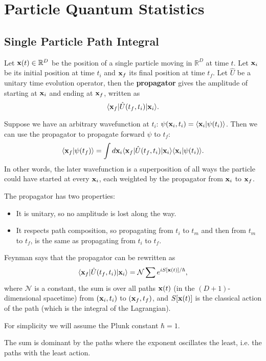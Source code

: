 \section{Particle Quantum Statistics}

\subsection{Single Particle Path Integral}


Let $\vb x (t) \in \mathbb{R}^D$ be the position of a single particle moving in $\mathbb{R}^D$ at time $t$. Let $\vb x_i$ be its initial position at time $t_i$ and $\vb x_f$ its final position at time $t_f$. Let $\hat{U}$ be a unitary time evolution operator, then the \textbf{propagator} gives the amplitude of starting at $\vb x_i$ and ending at $\vb x_f$, written as $$
\langle \vb x_f | \hat{U} (t_f, t_i) | \vb x_i \rangle
.$$        

Suppose we have an arbitrary wavefunction at $t_i$: $\psi (\vb x_i , t_i) = \langle \vb x_i | \psi (t_i)  \rangle$. Then we can use the propagator to propagate forward $\psi$ to $t_f$: $$
\langle \vb x_f | \psi (t_f) \rangle = \int d \vb x_i \langle \vb x_f | \hat{U} (t_f, t_i) | \vb x_i \rangle \langle \vb x_i | \psi (t_i)  \rangle
.$$  
In other words, the later wavefunction is a superposition of all ways the particle could have started at every $\vb x_i$, each weighted by the propagator from $\vb x_i$ to $\vb x_f$. 


The propagator has two properties:
\begin{itemize}
    \item It is unitary, so no amplitude is lost along the way.
    \item It respects path composition, so propagating from $t_i$ to $t_m$ and then from $t_m $ to $t_f$, is the same as propagating from $t_i$ to $t_f$. 
\end{itemize}

Feynman says that the propagator can be rewritten as 
$$
\langle \vb x_f | \hat{U} (t_f, t_i) | \vb x_i \rangle = \mathcal{N} \sum e^{i S[\vb x(t)] / \hbar }
,$$
where $\mathcal{N}$ is a constant,  the sum is over all paths $\vb x(t)$ (in the $(D+1)$-dimensional spacetime) from $(\vb x_i, t_i)$ to $(\vb x_f, t_f)$, and $S[\vb x(t)]$ is the classical action of the path (which is the integral of the Lagrangian).

For simplicity we will assume the Plunk constant $\hbar = 1$. 

The sum is dominant by the paths where the exponent oscillates the least, i.e. the paths with the least action. 

